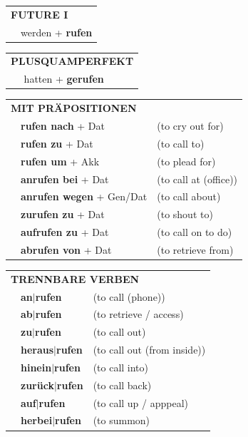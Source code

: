 \documentclass[10pt,a4paper]{revtex4-2}
\begin{document}
\begin{verbbox-acc}
\begin{tabular}{rl}
    \multicolumn{2}{l}{\textbf{FUTURE I} }\\
   & werden + \textbf{rufen}\\
 
  \end{tabular}
\hfill
   \begin{tabular}{rl}
      \multicolumn{2}{l}{\textbf{PLUSQUAMPERFEKT}}\\
   & hatten + \textbf{gerufen}\\
  \end{tabular}
  

 \vspace{10pt}

   \begin{tabular}{lll}
      \multicolumn{3}{l}{\textbf{MIT PRÄPOSITIONEN}}\\
& \textbf{rufen nach} + Dat & (to cry out for)\\
& \textbf{rufen zu} + Dat & (to call to)\\
&\textbf{rufen um} + Akk & (to plead for)\\
&\textbf{anrufen bei} + Dat & (to call at (office))\\
&\textbf{anrufen wegen} + Gen/Dat & (to call about)\\
&\textbf{zurufen zu} + Dat & (to shout to)\\
&\textbf{aufrufen zu} + Dat & (to call on to do)\\
&\textbf{abrufen von} + Dat & (to retrieve from)\\
  \end{tabular}
  \hfill
   \begin{tabular}{lll}
      \multicolumn{3}{l}{\textbf{TRENNBARE VERBEN}}\\
 & \textbf{an$|$rufen} & (to call (phone))\\
 & \textbf{ab$|$rufen} & (to retrieve / access)\\
 & \textbf{zu$|$rufen} & (to call out)\\
  & \textbf{heraus$|$rufen} & (to call out (from inside))\\
  & \textbf{hinein$|$rufen} & (to call into)\\
  & \textbf{zurück$|$rufen} & (to call back)\\
  & \textbf{auf$|$rufen} & (to call up / apppeal)\\
     & \textbf{herbei$|$rufen} & (to summon)\\  
  \end{tabular}


  \vspace{-5pt}

\end{verbbox-acc}
\end{document}
